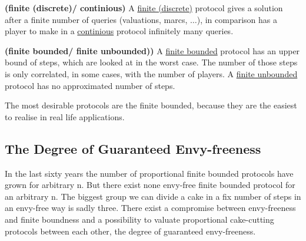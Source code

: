 \begin{defi}{\textbf{(finite (discrete)/ continious)}}
\newline A \underline{finite (discrete)} protocol gives a solution after a finite number of queries (valuations, marcs, $\ldots$), in comparison has a player to make in a \underline{continious} protocol infinitely many queries.
\end{defi}
\begin{defi}{\textbf{(finite bounded/ finite unbounded))}}
\newline A \underline{finite bounded} protocol has an upper bound of steps, which are looked at in the worst case. The number of those steps is only correlated, in some cases, with the number of players. A \underline{finite unbounded} protocol has no approximated number of steps.
\end{defi}
The most desirable protocols are the finite bounded, because they are the easiest to realise in real life applications. 
\pagebreak
\subsection{The Degree of Guaranteed Envy-freeness}
In the last sixty years the number of proportional finite bounded protocols have grown for arbitrary n. But there exist none envy-free finite bounded protocol for an arbitrary n. The biggest group we can divide a cake in a fix number of steps in an envy-free way is sadly three. There exist a compromise between envy-freeness and finite boundness and a possibility to valuate proportional cake-cutting protocols between each other, the degree of guaranteed envy-freeness. 

